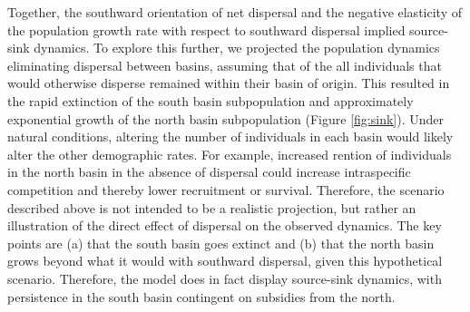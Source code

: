 Together, the southward orientation of net dispersal and the negative elasticity 
of the population growth rate with respect to southward dispersal implied source-sink dynamics. 
To explore this further, 
we projected the population dynamics eliminating dispersal between basins, 
assuming that of the all individuals that would otherwise disperse remained within
their basin of origin.
This resulted in the rapid extinction of the south basin subpopulation
and approximately exponential growth 
of the north basin subpopulation (Figure \ref{fig:sink}).
Under natural conditions, 
altering the number of individuals in each basin 
would likely alter the other demographic rates.
For example, increased rention of individuals in the north basin in the absence of dispersal
could increase intraspecific competition and thereby lower recruitment or survival.
Therefore, the scenario described above is not intended to be a realistic projection, 
but rather an illustration of the direct effect of dispersal on the observed dynamics.
The key points are 
(a) that the south basin goes extinct and 
(b) that the north basin grows beyond what it would with southward dispersal,
given this hypothetical scenario.
Therefore, the model does in fact display source-sink dynamics,
with persistence in the south basin contingent on subsidies from the north.








